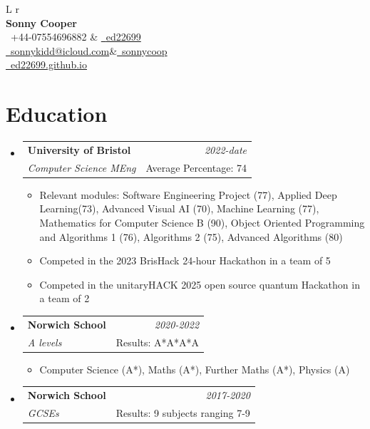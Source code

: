 \documentclass[a4paper,11pt]{article}
\makeatletter
\newcommand{\resumeSubheading}[4]{
\vspace{0.5mm}\item
    \begin{tabular*}{0.98\textwidth}[t]{l@{\extracolsep{\fill}}r}
        \textbf{#1} & \textit{\footnotesize{#4}} \\
        \textit{\footnotesize{#3}} &  \footnotesize{#2}\\
    \end{tabular*}
    \vspace{-2.4mm}
}
\newcommand{\resumeSubHeadingListStart}{\begin{itemize}[leftmargin=*,labelsep=0mm]}
\newcommand{\resumeItemListStart}{\begin{justify}\begin{itemize}[leftmargin=3ex, rightmargin=2ex, noitemsep,labelsep=1.2mm,itemsep=0mm]\small}
\newcommand{\resumeSubHeadingListEnd}{\end{itemize}\vspace{2mm}}
\newcommand{\resumeItemListEnd}{\end{itemize}\end{justify}\vspace{-2mm}}
\newcommand{\name}{Sonny Cooper} %
\newcommand{\phone}{07554696882}
\newcommand{\emaila}{sonnykidd@icloud.com}
\makeatother
\begin{document}
\selectfont


\parbox{\dimexpr\linewidth-0.3cm\relax}{
\begin{tabularx}{\linewidth}{L r} \\
  \textbf{\Large \name} \\ 
  {\raisebox{0.0\height}{\footnotesize \faPhone}\ +44-\phone} & \href{https://github.com/ed22699}{\raisebox{0.0\height}{\footnotesize \faGithub}\ {ed22699}}\\
  \href{mailto:\emaila}{\raisebox{0.0\height}{\footnotesize 
 \faEnvelope}\ {\emaila}}&\href{https://www.linkedin.com/in/sonnycoop}{\raisebox{0.0\height}{\footnotesize \faLinkedin}\ {sonnycoop}}\\ 
 \href{https://ed22699.github.io}{\raisebox{0.0\height}{\footnotesize \faGoogle}\ {ed22699.github.io}}
\end{tabularx}
}





\section{\textbf{Education}}
  \resumeSubHeadingListStart
    \resumeSubheading
      {University of Bristol}{Average Percentage: 74}
      {Computer Science MEng}{2022-date}
      \resumeItemListStart
      \item{Relevant modules: Software Engineering Project (77), Applied Deep Learning(73), 
              Advanced Visual AI (70), Machine Learning (77), Mathematics for Computer Science B (90),
          Object Oriented Programming and Algorithms 1 (76), Algorithms 2 (75), Advanced Algorithms (80)}
      \item{Competed in the 2023 BrisHack 24-hour Hackathon in a team of 5}
      \item{Competed in the unitaryHACK 2025 open source quantum Hackathon in a team of 2}
      \resumeItemListEnd
    \resumeSubheading
      {Norwich School}{Results: A*A*A*A}
      {A levels}{2020-2022}
      \resumeItemListStart
  \item{Computer Science (A*), Maths (A*), Further Maths (A*), Physics (A)}
      \resumeItemListEnd
  \resumeSubheading
      {Norwich School}{Results: 9 subjects ranging 7-9}
      {GCSEs}{2017-2020}
  \resumeSubHeadingListEnd
\vspace{-5.5mm}
%
\end{document}
